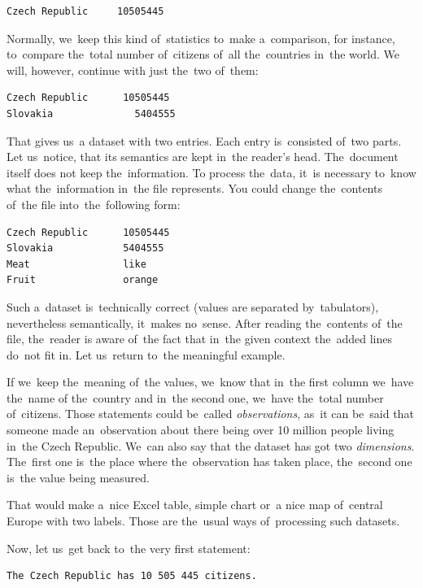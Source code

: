 \begin{verbatim}
Czech Republic     10505445
\end{verbatim}

Normally, we~keep this kind of~statistics to~make a~comparison, 
for instance, to~compare the~total number of~citizens of~all the~countries in~the world.
We will, however, continue with just the~two of~them:

\begin{verbatim}
Czech Republic	    10505445
Slovakia	          5404555
\end{verbatim}

That gives us~a dataset with two entries. Each entry is~consisted of~two parts. Let us~notice, that 
its semantics are kept in~the reader's head. The~document itself does not keep the~information.
To process the~data, it~is necessary to~know what the~information in~the file represents. You could change
the~contents of~the file into~the~following form:

\begin{verbatim}
Czech Republic      10505445
Slovakia            5404555
Meat                like
Fruit               orange
\end{verbatim}

Such a~dataset is~technically correct (values are separated by~tabulators), nevertheless 
semantically, it~makes no~sense. After reading the~contents of~the file, the~reader 
is aware of~the fact that in~the given context the~added lines do~not fit in.
Let us~return to~the meaningful example.

If we~keep the~meaning of~the values, we~know that in~the first column we~have the~name
of the~country and in~the second one, we~have the~total number of~citizens. Those statements
could be~called \emph{observations}, as~it can be~said that someone made an~observation 
about there being over 10 million people living in~the Czech Republic. We~can also say that the
dataset has got two \emph{dimensions}. The~first one is~the place where the~observation has taken
place, the~second one is~the value being measured.

That would make a~nice Excel table, simple chart or~a nice map of~central Europe with
two labels. Those are the~usual ways of~processing such datasets.

Now, let us~get back to~the very first statement:

\begin{verbatim}
The Czech Republic has 10 505 445 citizens.
\end{verbatim}

